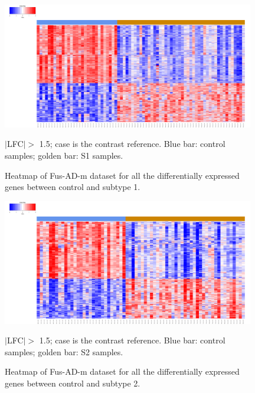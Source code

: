 \begin{figure}[!ht]
    \centerline{\includegraphics[width = 11cm]{Figures/DE heatmap/CTLvs1_AD-FUS-m_all.png}}
\caption{Heatmap of Fus-AD-m dataset for all the differentially expressed genes between control and subtype 1.}
\footnotesize $|$LFC$| >$ 1.5; case is the contrast reference. Blue bar: control samples; golden bar: S1 samples.
\end{figure}

\begin{figure}[!ht]
    \centerline{\includegraphics[width = 11cm]{Figures/DE heatmap/CTLvs2_AD-FUS-m_all.png}}
\caption{Heatmap of Fus-AD-m dataset for all the differentially expressed genes between control and subtype 2.}
\footnotesize $|$LFC$| >$ 1.5; case is the contrast reference. Blue bar: control samples; golden bar: S2 samples.
\end{figure}